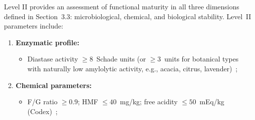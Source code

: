 Level II provides an assessment of functional maturity in all
three dimensions defined in Section~3.3: microbiological, chemical,
and biological stability. Level~II parameters include:

\begin{enumerate}
    \item \textbf{Enzymatic profile:}
    \begin{itemize}
        \item Diastase activity $\geq 8$~Schade units (or $\geq 3$~units
              for botanical types with naturally low amylolytic
              activity, e.g., acacia, citrus, lavender)~\cite{codex_stan12};
    \end{itemize}
    \item \textbf{Chemical parameters:}
    \begin{itemize}
        \item F/G ratio $\geq 0.9$; HMF $\leq 40$~mg/kg;
              free acidity $\leq 50$~mEq/kg
              (Codex)~\cite{codex_stan12};
    \end{itemize}
\end{enumerate}

